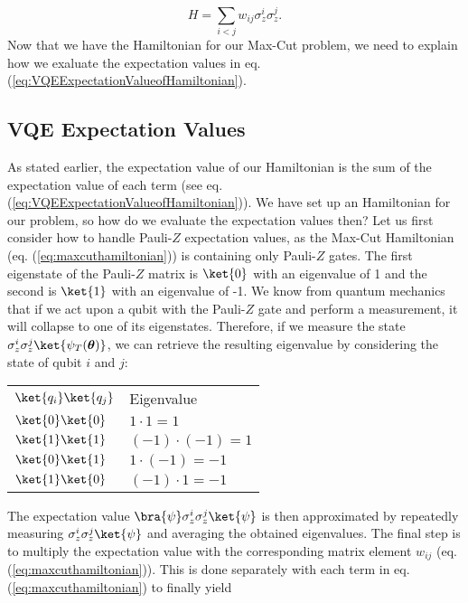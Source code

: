 \begin{equation}
    \label{eq:maxcuthamiltonian}
    H = \sum_{i<j}w_{ij}\sigma_z^i \sigma_z^j.
\end{equation}
Now that we have the Hamiltonian for our Max-Cut problem, we need to explain how we exaluate the expectation values in eq. (\ref{eq:VQEExpectationValueofHamiltonian}).


\subsection{VQE Expectation Values}
\label{subsec:VQEExpecVals}

As stated earlier, the expectation value of our Hamiltonian is the sum of the expectation value of each term (see eq. (\ref{eq:VQEExpectationValueofHamiltonian})). We have set up an Hamiltonian for our problem, so how do we evaluate the expectation values then? Let us first consider how to handle Pauli-$Z$ expectation values, as the Max-Cut Hamiltonian (eq. (\ref{eq:maxcuthamiltonian})) is containing only Pauli-$Z$ gates. The first eigenstate of the Pauli-$Z$ matrix is $\ket{0}$ with an eigenvalue of 1 and the second is $\ket{1}$ with an eigenvalue of -1. We know from quantum mechanics that if we act upon a qubit with the Pauli-$Z$ gate and perform a measurement, it will collapse to one of its eigenstates. Therefore, if we measure the state $\sigma_z^i \sigma_z^j \ket{\psi_T( \boldsymbol{\theta})}$, we can retrieve the resulting eigenvalue by considering the state of qubit $i$ and $j$:
\begin{table}[H]
\centering
\label{tab:paulizEigenvaluesEigenstates}
\begin{tabular}{ll}
\quad $\ket{q_i} \ket{q_j} $             & Eigenvalue            \\
\quad $\ket{0} \ket{0} $ & $1 \cdot 1 = 1$       \\
\quad $\ket{1} \ket{1} $ & $(-1) \cdot (-1) = 1$ \\
\quad $\ket{0} \ket{1} $ & $1 \cdot (-1) = -1 $  \\
\quad $\ket{1} \ket{0}$  & $(-1) \cdot 1 = -1 $ 
\end{tabular}
\end{table}
The expectation value $\bra{\psi} \sigma_z^i \sigma_z^j \ket{\psi} $ is then approximated by repeatedly measuring $\sigma_z^i \sigma_z^j \ket{\psi}$ and averaging the obtained eigenvalues. The final step is to multiply the expectation value with the corresponding matrix element $w_{ij}$ (eq. (\ref{eq:maxcuthamiltonian})). This is done separately with each term in eq. (\ref{eq:maxcuthamiltonian}) to finally yield

